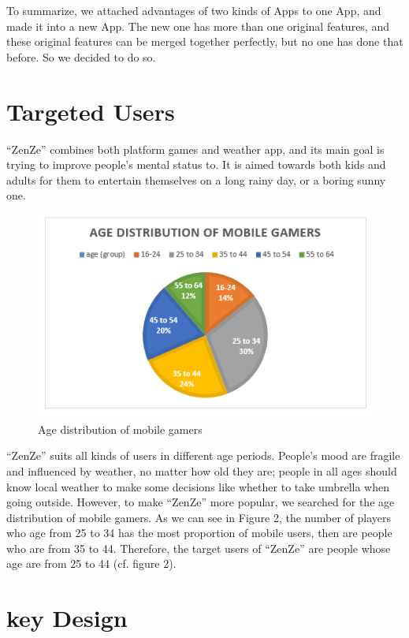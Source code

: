 \documentclass{sigchi}
\begin{document}
To summarize, we attached advantages of two kinds of Apps to one App, and made it into a new App. The new one has more than one original features, and these original features can be merged together perfectly, but no one has done that before. So we decided to do so.

\section{Targeted Users}
``ZenZe'' combines both platform games and weather app, and its main goal is trying to improve people's mental status to. It is aimed towards both kids and adults for them to entertain themselves on a long rainy day, or a boring sunny one.

\begin{figure}[!tb]
\centering
\includegraphics[scale=0.80]{figures/agedist.png}
\caption{Age distribution of mobile gamers}
\label{fig2}
\end{figure}

``ZenZe'' suits all kinds of users in different age periods. People's mood are fragile and influenced by weather, no matter how old they are; people in all ages should know local weather to make some decisions like whether to take umbrella when going  outside. However, to make ``ZenZe'' more popular, we searched for the age distribution of mobile gamers. As we can see in Figure 2, the number of players who age from 25 to 34 has the most proportion of  mobile users, then are people who are from 35 to 44. Therefore, the target users of ``ZenZe'' are people whose age are from 25 to 44 (cf. figure 2).

\section{key Design}
\end{document}
